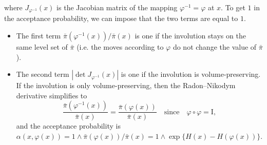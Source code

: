 \documentclass[english,graybox,envcountchap,envcountsame,sectrefs,shortlabels]{svmono}
\theoremstyle{style}
\newcommand{\Id}{\mathrm{I}}
\newcommand{\lrav}[1]{\left|#1 \right|}
\newcommand{\eqsp}{}
\begin{document}
where $J_{\varphi^{-1}}(x)$ is the Jacobian matrix of the mapping  $\varphi^{-1}=\varphi$ at $x$. To get $1$ in the acceptance probability, we can impose that the two terms are equal to $1$.
\begin{itemize}[-]
\item The first term $\bar{\pi}(\varphi^{-1}(x))/\bar{\pi}(x)$ is one if the involution stays on  the same level set of $\bar\pi$ (i.e. the moves according to $\varphi$ do not change the value of $\bar{\pi}$).
\item The second term $\lrav{\det J_{\varphi^{-1}}(x)}$ is one if the involution is volume-preserving. If the involution is only volume-preserving, then the Radon--Nikodym derivative simplifies to
$$
\frac{\bar{\pi}(\varphi^{-1}(x))}{\bar{\pi}(x)} =\frac{\bar{\pi}(\varphi(x))}{\bar{\pi}(x)}  \quad \mbox{since} \quad \varphi \circ \varphi=\Id\eqsp,
$$
and the acceptance probability is $\alpha(x,\varphi(x)) = 1\wedge\bar\pi(\varphi(x))/\bar\pi(x) = 1\wedge \exp\{H(x)-H(\varphi(x))\}$.
\end{itemize}
\end{document}
